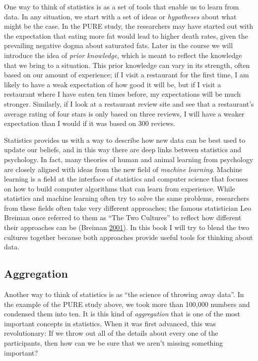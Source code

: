 \documentclass[12pt,]{book}
\theoremstyle{definition}
\theoremstyle{definition}
\theoremstyle{definition}
\theoremstyle{remark}
\begin{document}
One way to think of statistics is as a set of tools that enable us to learn from data. In any situation, we start with a set of ideas or \emph{hypotheses} about what might be the case. In the PURE study, the researchers may have started out with the expectation that eating more fat would lead to higher death rates, given the prevailing negative dogma about saturated fats. Later in the course we will introduce the idea of \emph{prior knowledge}, which is meant to reflect the knowledge that we bring to a situation. This prior knowledge can vary in its strength, often based on our amount of experience; if I visit a restaurant for the first time, I am likely to have a weak expectation of how good it will be, but if I visit a restaurant where I have eaten ten times before, my expectations will be much stronger. Similarly, if I look at a restaurant review site and see that a restaurant's average rating of four stars is only based on three reviews, I will have a weaker expectation than I would if it was based on 300 reviews.

Statistics provides us with a way to describe how new data can be best used to update our beliefs, and in this way there are deep links between statistics and psychology. In fact, many theories of human and animal learning from psychology are closely aligned with ideas from the new field of \emph{machine learning}. Machine learning is a field at the interface of statistics and computer science that focuses on how to build computer algorithms that can learn from experience. While statistics and machine learning often try to solve the same problems, researchers from these fields often take very different approaches; the famous statistician Leo Breiman once referred to them as ``The Two Cultures'' to reflect how different their approaches can be (Breiman \protect\hyperlink{ref-breiman2001}{2001}). In this book I will try to blend the two cultures together because both approaches provide useful tools for thinking about data.

\hypertarget{aggregation}{%
\subsection{Aggregation}\label{aggregation}}

Another way to think of statistics is as ``the science of throwing away data''. In the example of the PURE study above, we took more than 100,000 numbers and condensed them into ten. It is this kind of \emph{aggregation} that is one of the most important concepts in statistics. When it was first advanced, this was revolutionary: If we throw out all of the details about every one of the participants, then how can we be sure that we aren't missing something important?
\end{document}
